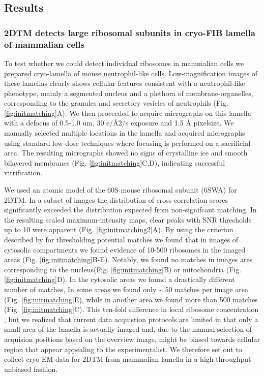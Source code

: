 \documentclass[
]{article}
\begin{document}
\hypertarget{results}{%
\subsection{Results}\label{results}}

\hypertarget{dtm-detects-large-ribosomal-subunits-in-cryo-fib-lamella-of-mammalian-cells}{%
\subsubsection{2DTM detects large ribosomal subunits in cryo-FIB lamella of mammalian cells}\label{dtm-detects-large-ribosomal-subunits-in-cryo-fib-lamella-of-mammalian-cells}}

To test whether we could detect individual ribosomes in mammalian cells we
prepared cryo-lamella of mouse neutrophil-like cells. Low-magnification images
of these lamellas clearly shows cellular features consistent with a
neutrophil-like phenotype, mainly a segmented nucleus and a plethora of
membrane-organelles, corresponding to the granules and secretory vesicles of
neutrophils (Fig. \ref{fig:initmatching}A). We then proceeded to acquire
micrographs on this lamella with a defocus of 0.5-1.0 um, 30 e/Å2/s exposure and
1.5 Å pixelsize. We manually selected multiple locations in the lamella and
acquired micrographs using standard low-dose techniques where focusing is performed on a
sacrificial area. The resulting micrographs showed no signs of crystalline ice
and smooth bilayered membranes (Fig. \ref{fig:initmatching}C,D), indicating successful vitrification.

We used an atomic model of the 60S mouse ribosomal subunit (6SWA) for 2DTM. In a subset of images the distribution of cross-correlation
scores significantly exceeded the distribution expected from non-signifcant
matching. In the resulting scaled maximum-intensity maps, clear peaks with SNR
thresholds up to 10 were apparent (Fig. \ref{fig:initmatching2}A). By using the
criterion described by for thresholding potential matches we found that in
images of cytosolic compartments we found evidence of 10-500 ribosomes in the
imaged areas (Fig. \ref{fig:initmatching}B-E). Notably, we found no matches in images ares corresponding to the
nucleus(Fig. \ref{fig:initmatching}B) or mitochondria (Fig. \ref{fig:initmatching}D). In the cytosolic areas we found a drastically different
number of matches, In some areas we found only \textasciitilde{} 50 matches per image area (Fig. \ref{fig:initmatching}E), while
in another area we found more than 500 matches (Fig. \ref{fig:initmatching}C). This ten-fold difference in
local ribosome concentration , but we realized that current data acquistion
protocols are limited in that only a small area of the lamella is actually
imaged and, due to the manual selection of acquision positions based on the
overview image, might be biased towards cellular region that appear appealing to
the experimentalist. We therefore set out to collect cryo-EM data for 2DTM from
mammalian lamella in a high-throughput unbiased fashion.
\end{document}
